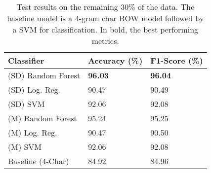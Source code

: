\begin{table}[h]
    \centering
    \small
    \begin{tabular}{l|ll}
    \toprule
    \textbf{Classifier} & \textbf{Accuracy (\%)}  & \textbf{F1-Score (\%)}  \\
    \midrule
    (SD) Random Forest & \textbf{96.03} & \textbf{96.04} \\
    (SD) Log. Reg. & 90.47  & 90.49 \\
    (SD) SVM & 92.06 & 92.08 \\
    (M) Random Forest & 95.24 & 95.25 \\
    (M) Log. Reg. & 90.47  & 90.50 \\
    (M) SVM & 92.06 & 92.08 \\
    \hline
    Baseline (4-Char) & 84.92 & 84.96 \\ 
    \bottomrule
    \end{tabular}
   \caption{Test results on the remaining 30\% of the data. The baseline model is a 4-gram char BOW model followed by a SVM for classification. In bold, the best performing metrics.}
    \label{tab:test_results}
\end{table}

